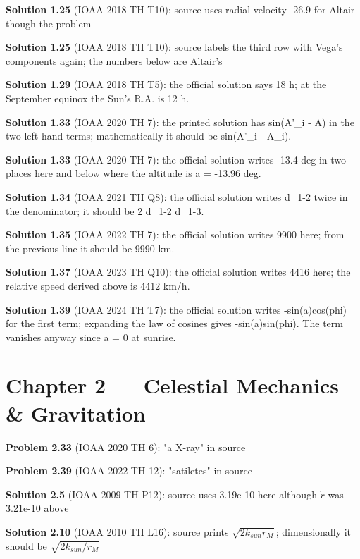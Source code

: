 \noindent\textbf{Solution 1.25} (IOAA 2018 TH T10): source uses radial velocity -26.9 for Altair though the problem
\smallskip

\noindent\textbf{Solution 1.25} (IOAA 2018 TH T10): source labels the third row with Vega's components again; the numbers below are Altair's
\smallskip

\noindent\textbf{Solution 1.29} (IOAA 2018 TH T5): the official solution says 18 h; at the September equinox the Sun's R.A. is 12 h.
\smallskip

\noindent\textbf{Solution 1.33} (IOAA 2020 TH 7): the printed solution has sin(A'\_i - A) in the two left-hand terms; mathematically it should be sin(A'\_i - A\_i).
\smallskip

\noindent\textbf{Solution 1.33} (IOAA 2020 TH 7): the official solution writes -13.4 deg in two places here and below where the altitude is a = -13.96 deg.
\smallskip

\noindent\textbf{Solution 1.34} (IOAA 2021 TH Q8): the official solution writes d\_{1-2} twice in the denominator; it should be 2 d\_{1-2} d\_{1-3}.
\smallskip

\noindent\textbf{Solution 1.35} (IOAA 2022 TH 7): the official solution writes 9900 here; from the previous line it should be 9990 km.
\smallskip

\noindent\textbf{Solution 1.37} (IOAA 2023 TH Q10): the official solution writes 4416 here; the relative speed derived above is 4412 km/h.
\smallskip

\noindent\textbf{Solution 1.39} (IOAA 2024 TH T7): the official solution writes -sin(a)cos(phi) for the first term; expanding the law of cosines gives -sin(a)sin(phi). The term vanishes anyway since a = 0 at sunrise.
\smallskip

\section*{Chapter 2 --- Celestial Mechanics \& Gravitation}

\noindent\textbf{Problem 2.33} (IOAA 2020 TH 6): "a X-ray" in source
\smallskip

\noindent\textbf{Problem 2.39} (IOAA 2022 TH 12): "satiletes" in source
\smallskip

\noindent\textbf{Solution 2.5} (IOAA 2009 TH P12): source uses 3.19e-10 here although $\dot{r}$ was 3.21e-10 above
\smallskip

\noindent\textbf{Solution 2.10} (IOAA 2010 TH L16): source prints $\sqrt{2k_{sun}r_M}$; dimensionally it should be $\sqrt{2k_{sun}/r_M}$
\smallskip

